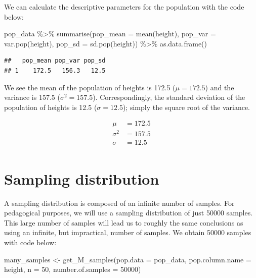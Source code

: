 \documentclass[
]{krantz}
\makeatletter
\newenvironment{Shaded}{\begin{snugshade}}{\end{snugshade}}
\newcommand{\AttributeTok}[1]{\textcolor[rgb]{0.61,0.61,0.61}{#1}}
\newcommand{\DecValTok}[1]{\textcolor[rgb]{0.06,0.06,0.06}{#1}}
\newcommand{\FunctionTok}[1]{\textcolor[rgb]{0,0,0}{#1}}
\newcommand{\NormalTok}[1]{#1}
\newcommand{\OtherTok}[1]{\textcolor[rgb]{0.37,0.37,0.37}{#1}}
\newcommand{\SpecialCharTok}[1]{\textcolor[rgb]{0,0,0}{#1}}
\newenvironment{kframe}{%
\medskip{}
\setlength{\fboxsep}{.8em}
 \def\at@end@of@kframe{}%
 \ifinner\ifhmode%
  \def\at@end@of@kframe{\end{minipage}}%
  \begin{minipage}{\columnwidth}%
 \fi\fi%
 \def\FrameCommand##1{\hskip\@totalleftmargin \hskip-\fboxsep
 \colorbox{shadecolor}{##1}\hskip-\fboxsep
     \hskip-\linewidth \hskip-\@totalleftmargin \hskip\columnwidth}%
 \MakeFramed {\advance\hsize-\width
   \@totalleftmargin\z@ \linewidth\hsize
   \@setminipage}}%
 {\par\unskip\endMakeFramed%
 \at@end@of@kframe}
\renewenvironment{Shaded}{\begin{kframe}}{\end{kframe}}
\makeatother
\begin{document}
We can calculate the descriptive parameters for the population with the code below:

\begin{Shaded}
\begin{Highlighting}[]
\NormalTok{pop\_data }\SpecialCharTok{\%\textgreater{}\%}
  \FunctionTok{summarise}\NormalTok{(}\AttributeTok{pop\_mean =} \FunctionTok{mean}\NormalTok{(height),}
            \AttributeTok{pop\_var =} \FunctionTok{var.pop}\NormalTok{(height),}
            \AttributeTok{pop\_sd =} \FunctionTok{sd.pop}\NormalTok{(height)) }\SpecialCharTok{\%\textgreater{}\%}
  \FunctionTok{as.data.frame}\NormalTok{()}
\end{Highlighting}
\end{Shaded}

\begin{verbatim}
##   pop_mean pop_var pop_sd
## 1    172.5   156.3   12.5
\end{verbatim}

We see the mean of the population of heights is 172.5 (\(\mu = 172.5\)) and the variance is 157.5 (\(\sigma^2 = 157.5\)). Correspondingly, the standard deviation of the population of heights is 12.5 (\(\sigma = 12.5\)); simply the square root of the variance.

\[
\begin{aligned} 
\mu &= 172.5 \\
\sigma^2 &= 157.5 \\
\sigma &= 12.5 \\
\end{aligned} 
\]

\hypertarget{sampling-distribution}{%
\section{Sampling distribution}\label{sampling-distribution}}

A sampling distribution is composed of an infinite number of samples. For pedagogical purposes, we will use a sampling distribution of just 50000 samples. This large number of samples will lead us to roughly the same conclusions as using an infinite, but impractical, number of samples. We obtain 50000 samples with code below:

\begin{Shaded}
\begin{Highlighting}[]
\NormalTok{many\_samples }\OtherTok{\textless{}{-}} \FunctionTok{get\_M\_samples}\NormalTok{(}\AttributeTok{pop.data =}\NormalTok{ pop\_data, }
                              \AttributeTok{pop.column.name =}\NormalTok{ height,}
                              \AttributeTok{n =} \DecValTok{50}\NormalTok{,}
                              \AttributeTok{number.of.samples =} \DecValTok{50000}\NormalTok{)}
\end{Highlighting}
\end{Shaded}
\end{document}
